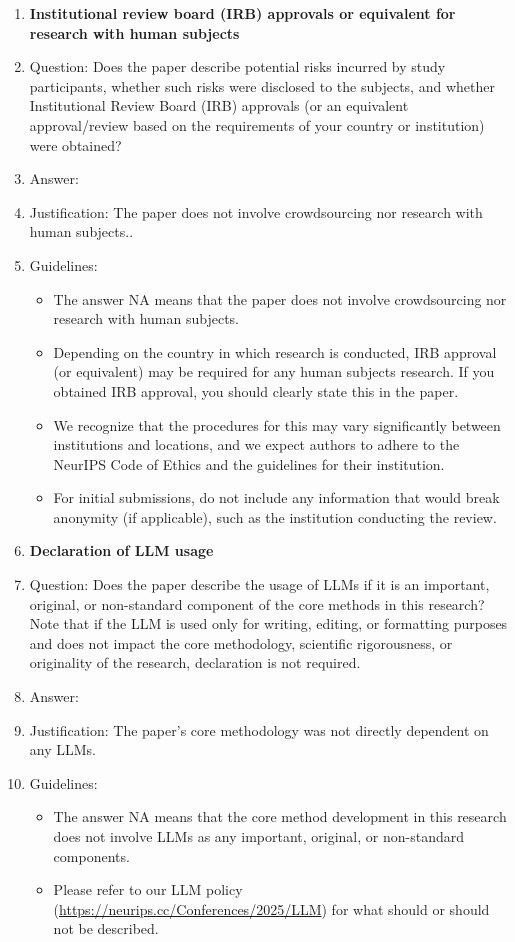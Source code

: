 \documentclass{article}
\theoremstyle{definition} \newtheorem{definition}{Definition}  \newtheorem{example}{Example}
\theoremstyle{remark} \newtheorem{remark}{Remark}
\newcounter{ct}
\begin{document}
\begin{enumerate}
\item {\bf Institutional review board (IRB) approvals or equivalent for research with human subjects}
    \item[] Question: Does the paper describe potential risks incurred by study participants, whether such risks were disclosed to the subjects, and whether Institutional Review Board (IRB) approvals (or an equivalent approval/review based on the requirements of your country or institution) were obtained?
    \item[] Answer: \answerNA{} %
    \item[] Justification: The paper does not involve crowdsourcing nor research with human subjects..
    \item[] Guidelines:
    \begin{itemize}
        \item The answer NA means that the paper does not involve crowdsourcing nor research with human subjects.
        \item Depending on the country in which research is conducted, IRB approval (or equivalent) may be required for any human subjects research. If you obtained IRB approval, you should clearly state this in the paper. 
        \item We recognize that the procedures for this may vary significantly between institutions and locations, and we expect authors to adhere to the NeurIPS Code of Ethics and the guidelines for their institution. 
        \item For initial submissions, do not include any information that would break anonymity (if applicable), such as the institution conducting the review.
    \end{itemize}

\item {\bf Declaration of LLM usage}
    \item[] Question: Does the paper describe the usage of LLMs if it is an important, original, or non-standard component of the core methods in this research? Note that if the LLM is used only for writing, editing, or formatting purposes and does not impact the core methodology, scientific rigorousness, or originality of the research, declaration is not required.
    \item[] Answer: \answerNA{} %
    \item[] Justification: The paper's core methodology was not directly dependent on any LLMs.
    \item[] Guidelines:
    \begin{itemize}
        \item The answer NA means that the core method development in this research does not involve LLMs as any important, original, or non-standard components.
        \item Please refer to our LLM policy (\url{https://neurips.cc/Conferences/2025/LLM}) for what should or should not be described.
    \end{itemize}

\end{enumerate}
\end{document}
